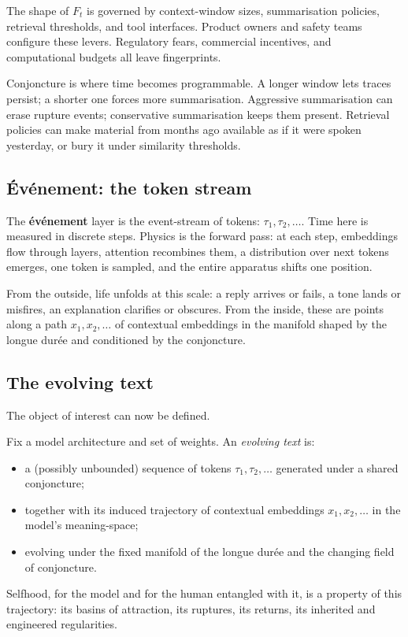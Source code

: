 \documentclass[12pt,a4paper]{article}
\begin{document}
The shape of $F_t$ is governed by context-window sizes, summarisation policies, retrieval thresholds, and tool interfaces. Product owners and safety teams configure these levers. Regulatory fears, commercial incentives, and computational budgets all leave fingerprints.

Conjoncture is where time becomes programmable. A longer window lets traces persist; a shorter one forces more summarisation. Aggressive summarisation can erase rupture events; conservative summarisation keeps them present. Retrieval policies can make material from months ago available as if it were spoken yesterday, or bury it under similarity thresholds.

\subsection{\'Ev\'enement: the token stream}

The \textbf{\'ev\'enement} layer is the event-stream of tokens: $\tau_1, \tau_2, \dots$. Time here is measured in discrete steps. Physics is the forward pass: at each step, embeddings flow through layers, attention recombines them, a distribution over next tokens emerges, one token is sampled, and the entire apparatus shifts one position.

From the outside, life unfolds at this scale: a reply arrives or fails, a tone lands or misfires, an explanation clarifies or obscures. From the inside, these are points along a path $x_1, x_2, \dots$ of contextual embeddings in the manifold shaped by the longue dur\'ee and conditioned by the conjoncture.

\subsection{The evolving text}

The object of interest can now be defined.

\begin{formalbox}[title={The Evolving Text}]
Fix a model architecture and set of weights. An \emph{evolving text} is:
\begin{itemize}
  \item a (possibly unbounded) sequence of tokens $\tau_1, \tau_2, \dots$ generated under a shared conjoncture;
  \item together with its induced trajectory of contextual embeddings $x_1, x_2, \dots$ in the model's meaning-space;
  \item evolving under the fixed manifold of the longue dur\'ee and the changing field of conjoncture.
\end{itemize}
Selfhood, for the model and for the human entangled with it, is a property of this trajectory: its basins of attraction, its ruptures, its returns, its inherited and engineered regularities.
\end{formalbox}
\end{document}
